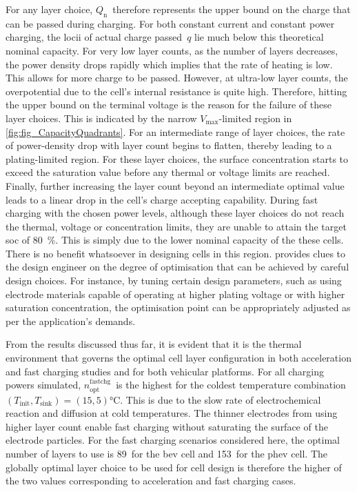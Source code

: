 For any layer  choice, $Q_\text{n}$~therefore represents the upper  bound on the
charge  that can  be  passed  during charging.  For  both  constant current  and
constant power  charging, the locii of  actual charge passed~$q$ lie  much below
this theoretical nominal  capacity. For very low layer counts,  as the number of
layers decreases, the power density drops rapidly which implies that the rate of
heating is low. This allows for more  charge to be passed. However, at ultra-low
layer counts, the  overpotential due to the cell's internal  resistance is quite
high.  Therefore,  hitting the  upper  bound  on  the  terminal voltage  is  the
reason  for  the failure  of  these  layer choices.  This  is  indicated by  the
narrow \mbox{$V_\text{max}$-limited} region in \cref{fig:fig_CapacityQuadrants}. For an
intermediate range of  layer choices, the rate of power-density  drop with layer
count begins to flatten, thereby leading  to a plating-limited region. For these
layer choices, the  surface concentration starts to exceed  the saturation value
before any  thermal or voltage  limits are reached. Finally,  further increasing
the layer count beyond  an intermediate optimal value leads to  a linear drop in
the cell's  charge accepting  capability. During fast  charging with  the chosen
power levels, although these layer choices  do not reach the thermal, voltage or
concentration  limits,  they  are  unable  to attain  the  target  \gls{soc}  of
\SI{80}{\percent}. This is simply due to the lower nominal capacity of the these
cells.  There is  no  benefit  whatsoever in  designing  cells  in this  region.
 provides  clues to  the design engineer  on the
degree  of optimisation  that can  be achieved  by careful  design choices.  For
instance, by tuning certain design parameters, such as using electrode materials
capable  of  operating at  higher  plating  voltage  or with  higher  saturation
concentration, the optimisation  point can be appropriately adjusted  as per the
application's demands.


From  the results  discussed thus  far, it  is evident  that it  is the  thermal
environment  that  governs   the  optimal  cell  layer   configuration  in  both
acceleration and fast charging studies and for both vehicular platforms. For all
charging powers simulated, $n^\text{fastchg}_\text{opt}$~is the highest for the
coldest temperature  combination~${(T_\text{init},T_\text{sink}) =  (15, 5)
\si{\degreeCelsius}}$. This is due to  the slow rate of electrochemical reaction
and diffusion  at cold  temperatures. The thinner  electrodes from  using higher
layer count enable fast charging without saturating the surface of the electrode
particles. For the  fast charging scenarios considered here,  the optimal number
of layers to use  is 89~for the \gls{bev} cell and  153~for the \gls{phev} cell.
The globally optimal  layer choice to be  used for cell design  is therefore the
higher of the two values corresponding  to acceleration and fast charging cases.

